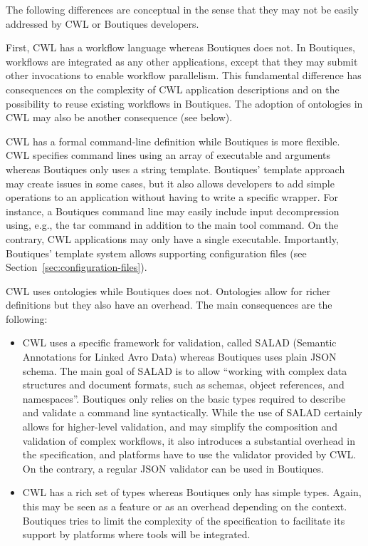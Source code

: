 \documentclass{article}
\newcommand{\boutiques}{Boutiques\xspace}
\begin{document}
The following differences are conceptual in the sense that they may
not be easily addressed by CWL or Boutiques developers.

First, CWL has a workflow language whereas \boutiques does not. In
\boutiques, workflows are integrated as any other applications, except
that they may submit other invocations to enable workflow
parallelism. This fundamental difference has consequences on the
complexity of CWL application descriptions and on the possibility to
reuse existing workflows in \boutiques. The adoption of ontologies in
CWL may also be another consequence (see below).

CWL has a formal command-line definition while \boutiques is more
flexible. CWL specifies command lines using an array of executable and
arguments whereas \boutiques only uses a string template. \boutiques'
template approach may create issues in some cases, but it also allows
developers to add simple operations to an application without having
to write a specific wrapper. For instance, a \boutiques command line
may easily include input decompression using, e.g., the tar command in
addition to the main tool command. On the contrary, CWL applications
may only have a single executable. Importantly, \boutiques' template
system allows supporting configuration files (see
Section~\ref{sec:configuration-files}).

CWL uses ontologies while \boutiques does not. Ontologies allow for
richer definitions but they also have an overhead. The main
consequences are the following:
\begin{itemize}
\item CWL uses a specific framework for
validation, called SALAD (Semantic Annotations for Linked Avro Data)
whereas Boutiques uses plain JSON schema. The main goal of SALAD is to
allow ``working with complex data structures and document formats, such
as schemas, object references, and namespaces''. \boutiques only relies
on the basic types required to describe and validate a command line
syntactically. While the use of SALAD certainly allows for
higher-level validation, and may simplify the composition and
validation of complex workflows, it also introduces a substantial
overhead in the specification, and platforms have to use the validator
provided by CWL. On the contrary, a regular JSON validator can be used in \boutiques.
\item  CWL has a rich set of types whereas \boutiques only has simple
types. Again, this may be seen as a feature or as an overhead
depending on the context. \boutiques tries to limit the complexity of
the specification to facilitate its support by platforms where tools
will be integrated.
\end{itemize}
\end{document}
